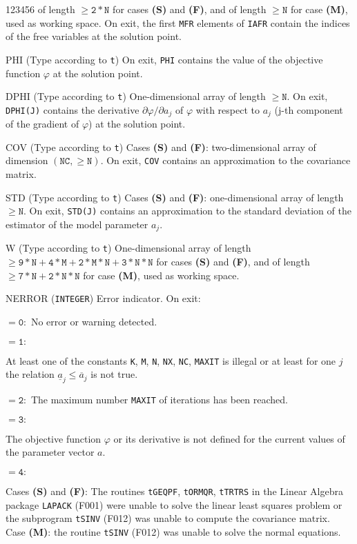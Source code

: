\begin{DLtt}{123456}
of length $\mathtt{\ge 2*N}$ for cases {\bf (S)} and {\bf (F)}, and of
length $\mathtt{\ge N}$ for case {\bf (M)}, used as working space.
On exit, the first {\tt MFR} elements of {\tt IAFR} contain the
indices of the free variables at the solution point.
\item[PHI]  (Type according to {\tt t}) On exit, {\tt PHI} contains the
value of the objective function $\varphi$ at the solution point.
\item[DPHI] (Type according to {\tt t}) One-dimensional array of length
$\mathtt{\ge N}$.
On exit, {\tt DPHI(J)} contains the derivative
$\partial \varphi / \partial a_j$  of $\varphi$ with
respect to $a_j$ (j-th component of the gradient of $\varphi$)
at the solution point.
\item[COV] (Type according to {\tt t}) Cases {\bf (S)} and {\bf (F)}:
two-dimensional array of dimension $\mathtt{(NC , \ge N)}$. On exit,
{\tt COV} contains an approximation to the covariance matrix.
\item[STD] (Type according to {\tt t}) Cases {\bf (S)} and {\bf (F)}:
one-dimensional array of length $\mathtt{\ge N}$. On exit, {\tt STD(J)}
contains an approximation to the standard deviation of the estimator
of the model parameter $a_j$.
\item[W] (Type according to {\tt t}) One-dimensional array of length
$\mathtt{\ge 9*N+4*M+2*M*N+3*N*N}$ for cases {\bf (S)} and {\bf (F)},
and of length $\mathtt{\ge 7*N+2*N*N}$ for case {\bf (M)}, used as
working space.
\item[NERROR] ({\tt INTEGER}) Error indicator. On exit:
\item[]$\mathtt{ = 0:}$ No error or warning detected.
\item[]$\mathtt{ = 1:}$ \parbox[t]{139mm}{
At least one of the constants {\tt K}, {\tt M}, {\tt N}, {\tt NX},
{\tt NC}, {\tt MAXIT} is illegal or at least for one $j$ the relation
$ \underline{a}_j \leq \overline{a}_j$ is not true.}
\item[]$\mathtt{ = 2:}$
The maximum number {\tt MAXIT} of iterations has been reached.
\item[]$\mathtt{ = 3:}$ \parbox[t]{139mm}{
The objective function $\varphi$ or its derivative is not defined for
the current values of the parameter vector $a$.}
\item[]$\mathtt{ = 4:}$ \parbox[t]{139mm}{
Cases {\bf (S)} and {\bf (F)}:
The routines {\tt tGEQPF}, {\tt tORMQR}, {\tt tTRTRS} in the Linear
Algebra package {\tt LAPACK} (F001) were unable to solve the linear
least squares problem or the subprogram {\tt tSINV} (F012) was unable
to compute the covariance matrix. \\
Case {\bf (M)}: the routine {\tt tSINV} (F012) was unable to solve
the normal equations.}
\end{DLtt}
 
